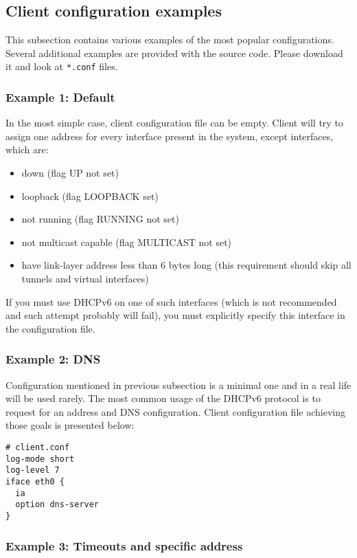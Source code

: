 \subsection{Client configuration examples}
This subsection contains various examples of the most popular
configurations. Several additional examples are provided with the source
code. Please download it and look at \verb+*.conf+ files.

\subsubsection{Example 1: Default}
In the most simple case, client configuration file can be empty. Client will try to
assign one address for every interface present in the system, except
interfaces, which are:
\begin{itemize}
\item down (flag UP not set)
\item loopback (flag LOOPBACK set)
\item not running (flag RUNNING not set)
\item not multicast capable (flag MULTICAST not set)
\item have link-layer address less than 6 bytes long (this requirement
      should skip all tunnels and virtual interfaces)
\end{itemize}

If you must use DHCPv6 on one of such interfaces (which is not
recommended and such attempt probably will fail), you must explicitly
specify this interface in the configuration file.

\subsubsection{Example 2: DNS}
Configuration mentioned in previous subsection is a minimal one and in a
real life will be used rarely. The most common usage of the DHCPv6
protocol is to request for an address and DNS configuration. Client
configuration file achieving those goals is presented below:
\begin{lstlisting}
# client.conf
log-mode short
log-level 7
iface eth0 {
  ia
  option dns-server
}
\end{lstlisting}

\subsubsection{Example 3: Timeouts and specific address}

